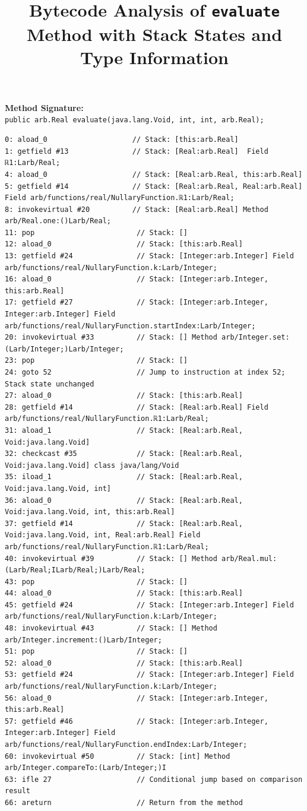 \documentclass{article}
\title{Bytecode Analysis of \texttt{evaluate} Method with Stack States and Type Information}
\begin{document}
\maketitle

\textbf{Method Signature:} \\
\texttt{public arb.Real evaluate(java.lang.Void, int, int, arb.Real);}

\begin{verbatim}
0: aload_0                    // Stack: [this:arb.Real]
1: getfield #13               // Stack: [Real:arb.Real]  Field ℝ1:Larb/Real;
4: aload_0                    // Stack: [Real:arb.Real, this:arb.Real]
5: getfield #14               // Stack: [Real:arb.Real, Real:arb.Real] Field arb/functions/real/NullaryFunction.ℝ1:Larb/Real;
8: invokevirtual #20          // Stack: [Real:arb.Real] Method arb/Real.one:()Larb/Real;
11: pop                        // Stack: []
12: aload_0                    // Stack: [this:arb.Real]
13: getfield #24               // Stack: [Integer:arb.Integer] Field arb/functions/real/NullaryFunction.k:Larb/Integer;
16: aload_0                    // Stack: [Integer:arb.Integer, this:arb.Real]
17: getfield #27               // Stack: [Integer:arb.Integer, Integer:arb.Integer] Field arb/functions/real/NullaryFunction.startIndex:Larb/Integer;
20: invokevirtual #33          // Stack: [] Method arb/Integer.set:(Larb/Integer;)Larb/Integer;
23: pop                        // Stack: []
24: goto 52                    // Jump to instruction at index 52; Stack state unchanged
27: aload_0                    // Stack: [this:arb.Real]
28: getfield #14               // Stack: [Real:arb.Real] Field arb/functions/real/NullaryFunction.ℝ1:Larb/Real;
31: aload_1                    // Stack: [Real:arb.Real, Void:java.lang.Void]
32: checkcast #35              // Stack: [Real:arb.Real, Void:java.lang.Void] class java/lang/Void
35: iload_1                    // Stack: [Real:arb.Real, Void:java.lang.Void, int]
36: aload_0                    // Stack: [Real:arb.Real, Void:java.lang.Void, int, this:arb.Real]
37: getfield #14               // Stack: [Real:arb.Real, Void:java.lang.Void, int, Real:arb.Real] Field arb/functions/real/NullaryFunction.ℝ1:Larb/Real;
40: invokevirtual #39          // Stack: [] Method arb/Real.mul:(Larb/Real;ILarb/Real;)Larb/Real;
43: pop                        // Stack: []
44: aload_0                    // Stack: [this:arb.Real]
45: getfield #24               // Stack: [Integer:arb.Integer] Field arb/functions/real/NullaryFunction.k:Larb/Integer;
48: invokevirtual #43          // Stack: [] Method arb/Integer.increment:()Larb/Integer;
51: pop                        // Stack: []
52: aload_0                    // Stack: [this:arb.Real]
53: getfield #24               // Stack: [Integer:arb.Integer] Field arb/functions/real/NullaryFunction.k:Larb/Integer;
56: aload_0                    // Stack: [Integer:arb.Integer, this:arb.Real]
57: getfield #46               // Stack: [Integer:arb.Integer, Integer:arb.Integer] Field arb/functions/real/NullaryFunction.endIndex:Larb/Integer;
60: invokevirtual #50          // Stack: [int] Method arb/Integer.compareTo:(Larb/Integer;)I
63: ifle 27                    // Conditional jump based on comparison result
66: areturn                    // Return from the method
\end{verbatim}
\end{document}
